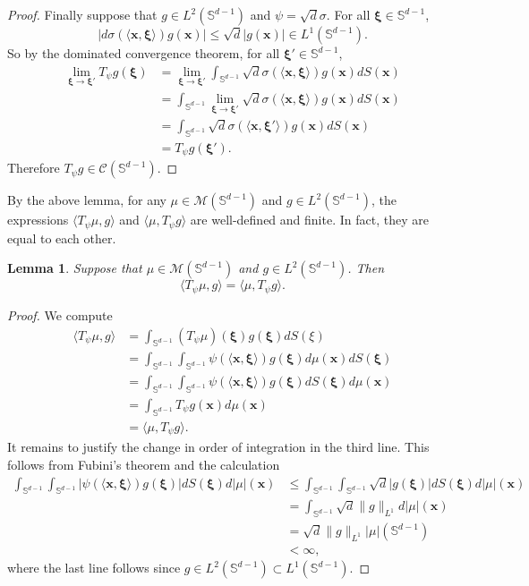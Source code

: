 \documentclass{article}
\newtheorem{lemma}[theorem]{Lemma}
\theoremstyle{definition}
\newcommand{\mc}{\mathcal}
\renewcommand{\S}{\mathbb{S}}
\def\vx{{\bm{x}}}
\begin{document}
\begin{proof}
    Finally suppose that $g \in L^2(\S^{d -1 })$ and $\psi = \sqrt{d}\sigma$. For all $\bm{\xi} \in \S^{d - 1}$,
    \[|d\sigma(\langle \vx, \bm{\xi} \rangle) g(\vx)| \leq \sqrt{d}|g(\vx)| \in L^1(\S^{d -1 }). \]
    So by the dominated convergence theorem, for all $\bm{\xi}' \in \S^{d - 1}$,
    \begin{align*}
        \lim_{\bm{\xi} \to \bm{\xi}'} T_{\psi}g(\bm{\xi}) &= \lim_{\bm{\xi} \to \bm{\xi'} } \int_{\S^{d-1}}\sqrt{d}\sigma(\langle \vx, \bm{\xi} \rangle) g(\vx)dS(\vx)\\
        &= \int_{\S^{d -1 }} \lim_{\bm{\xi} \to \bm{\xi}'} \sqrt{d}\sigma(\langle \vx, \bm{\xi}\rangle) g(\vx)dS(\vx)\\
        &= \int_{\S^{d - 1}}\sqrt{d}\sigma(\langle \vx, \bm{\xi}' \rangle)g(\vx)dS(\vx)\\
        &= T_{\psi}g(\bm{\xi}').
    \end{align*}
    Therefore $T_{\psi}g \in \mc{C}(\S^{d - 1})$.
\end{proof}
By the above lemma, for any $\mu \in \mc{M}(\S^{d -1})$ and $g \in L^2(\S^{d - 1})$, the expressions $\langle T_{\psi}\mu, g \rangle$ and $\langle \mu, T_{\psi}g \rangle$ are well-defined and finite. In fact, they are equal to each other.
\begin{lemma}\label{lemma:T-self-adjoint}
    Suppose that $\mu \in \mc{M}(\S^{d - 1})$ and $g \in L^2(\S^{d - 1})$. Then
    \[\langle T_{\psi}\mu, g \rangle = \langle \mu, T_{\psi}g \rangle. \]
\end{lemma}
\begin{proof}
    We compute
    \begin{align*}
        \langle T_{\psi} \mu, g \rangle &= \int_{\S^{d-1}} (T_{\psi}\mu)(\bm{\xi}) {g(\bm{\xi})} dS(\xi)\\
        &= \int_{\S^{d-1}}\int_{\S^{d-1}} \psi(\langle \vx, \bm{\xi} \rangle) {g(\bm{\xi})} d\mu(\vx) dS(\bm{\xi})\\
        &= \int_{\S^{d-1}}\int_{\S^{d-1}} \psi(\langle \vx, \bm{\xi} \rangle) {g(\bm{\xi})} dS(\bm{\xi})d\mu(\vx)\\
        &= \int_{\S^{d-1}} {T_{\psi}g(\vx)} d\mu(\vx)\\
        &= \langle \mu, T_{\psi}g \rangle.
    \end{align*}
    It remains to justify the change in order of integration in the third line. This follows from Fubini's theorem and the calculation
    \begin{align*}
        \int_{\S^{d-1}}\int_{\S^{d-1}} |\psi(\langle \vx, \bm{\xi} \rangle)g(\bm{\xi})|dS(\bm{\xi}) d|\mu|(\vx)
        &\leq \int_{\S^{d-1}} \int_{\S^{d-1}}\sqrt{d}|g(\bm{\xi})|dS(\bm{\xi})d|\mu|(\bm{x})\\
        &= \int_{\S^{d-1}}\sqrt{d}\|g\|_{L^1} d|\mu|(\vx)
        \\&= \sqrt{d}\|g\|_{L^1} |\mu|(\S^{d -1 })\\
        &< \infty,
    \end{align*}
    where the last line follows since $g \in L^2(\S^{d-1}) \subset L^1(\S^{d-1})$.
\end{proof}
\end{document}
